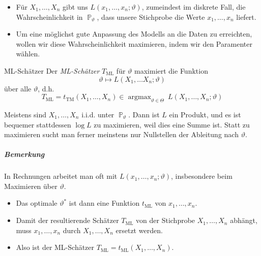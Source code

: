 \documentclass[a4paper,10pt]{article}
\renewcommand{\P}{\operatorname{\mathbb{P}}}
\DeclareMathOperator{\Ber}{Ber}
\numberwithin{equation}{section}
\begin{document}
\begin{itemize}
    \item Für \( X_1, \dots, X_n \) gibt uns \( L(x_1, \dots, x_n; \vartheta) \), zumeindest im diskrete Fall, die Wahrscheinlichkeit in \( \P_\vartheta \), dass unsere Stichprobe die Werte \( x_1, \dots, x_n \) liefert.
    \item Um eine möglichst gute Anpassung des Modells an die Daten zu erreichten, wollen wir diese Wahrscheinlichkeit maximieren, indem wir den Paramenter  wählen.
\end{itemize}

\begin{mainbox}{ML-Schätzer}
    Der \emph{ML-Schätzer} \( T_\text{ML} \) für \( \vartheta \) maximiert die Funktion
    \[
        \vartheta \mapsto L(X_1, \dots X_n; \vartheta)
    \]
    über alle \( \vartheta \), d.h.
    \[
        T_\text{ML} = t_\text{TM}(X_1, \dots, X_n) \in \mathop{\arg \max}_{\vartheta \in \Theta} \ L(X_1, \dots, X_n; \vartheta)
    \]
\end{mainbox}
Meistens sind \( X_1, \dots, X_n \) i.i.d. unter \( \P_\vartheta \). Dann ist \( L \) ein Produkt, und es ist bequemer stattdessen \( \log L \) zu maximieren, weil dies eine Summe ist.
Statt zu maximieren sucht man ferner meinstens nur Nullstellen der Ableitung nach \( \vartheta \).

\subparagraph{Bemerkung} In Rechnungen arbeitet man oft mit \( L(x_1, \dots, x_n; \vartheta) \), insbesondere beim Maximieren über \( \vartheta \).
\begin{itemize}
    \item Das optimale \( \vartheta^* \) ist dann eine Funktion \( t_\text{ML} \) von \( x_1, \dots, x_n \).
    \item Damit der resultierende Schätzer \( T_\text{ML} \) von der Stichprobe \( X_1, \dots, X_n \) abhängt, muss \( x_1, \dots, x_n \) durch \( X_1, \dots, X_n \) ersetzt werden.
    \item Also ist der ML-Schätzer \( T_\text{ML} = t_\text{ML}(X_1, \dots, X_n) \).
\end{itemize}

\end{document}
